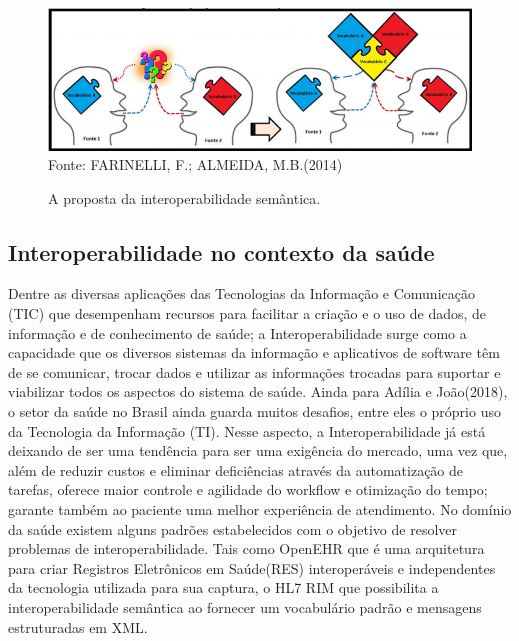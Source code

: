  \begin{figure}[htbp]
    	\centering
        \caption{A proposta da interoperabilidade semântica.}
        \label{fig:mapeamento-ontologia.png}
        \includegraphics[width=1\linewidth]{mapeamento-ontologia.png}
        Fonte: FARINELLI, F.; ALMEIDA, M.B.(2014)
\end{figure}

\subsection{Interoperabilidade no contexto da saúde}
Dentre as diversas aplicações das Tecnologias da Informação e Comunicação (TIC) que desempenham recursos para facilitar a criação e o uso de dados, de informação e de conhecimento de saúde; a Interoperabilidade surge como a capacidade que os diversos sistemas da informação e aplicativos de software têm de se comunicar, trocar dados e utilizar as informações trocadas para suportar e viabilizar todos os aspectos do sistema de saúde\cite{SCIARRA}. Ainda para Adília e João(2018)\cite{SCIARRA},  o setor da saúde no Brasil ainda guarda muitos desafios, entre eles o próprio uso da Tecnologia da Informação (TI). Nesse aspecto, a Interoperabilidade já está deixando de ser uma tendência para ser uma exigência do mercado, uma vez que, além de reduzir custos e eliminar deficiências através da automatização de tarefas, oferece maior controle e agilidade do workflow e otimização do tempo; garante também ao paciente uma melhor experiência de atendimento. 
    No domínio da saúde existem alguns padrões estabelecidos com o objetivo de resolver problemas de interoperabilidade. Tais como OpenEHR que é uma arquitetura para criar Registros Eletrônicos em Saúde(RES) interoperáveis e independentes da tecnologia utilizada para sua captura, o  HL7 RIM que possibilita a interoperabilidade semântica ao fornecer um vocabulário padrão e mensagens estruturadas em XML.
